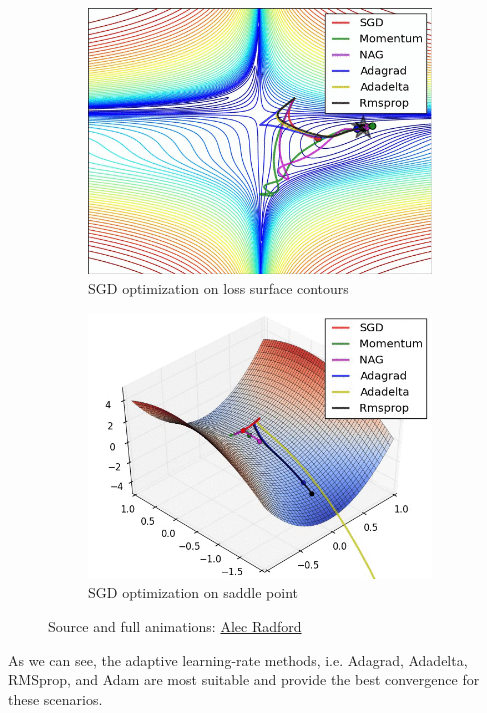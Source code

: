 \documentclass{article}
\begin{document}
\begin{figure}[!htb]
    \centering
    \begin{subfigure}{.5\textwidth}
        \centering
        \includegraphics[width=0.8\linewidth]{images/contours_evaluation_optimizers_final_frame.png}
        \caption{SGD optimization on loss surface contours}
        \label{fig:contours_evaluation_optimizers}
    \end{subfigure}%
    \begin{subfigure}{0.5\textwidth}
        \centering
        \includegraphics[width=0.8\linewidth]{images/saddle_point_evaluation_optimizers_frame.png}
        \caption{SGD optimization on saddle point}
        \label{fig:saddle_point_evaluation_optimizers}
    \end{subfigure}
    \caption{Source and full animations: \href{http://imgur.com/a/Hqolp}{Alec Radford}}
\end{figure}

As we can see, the adaptive learning-rate methods, i.e. Adagrad, Adadelta, RMSprop, and Adam are most suitable and provide the best convergence for these scenarios.
\end{document}
